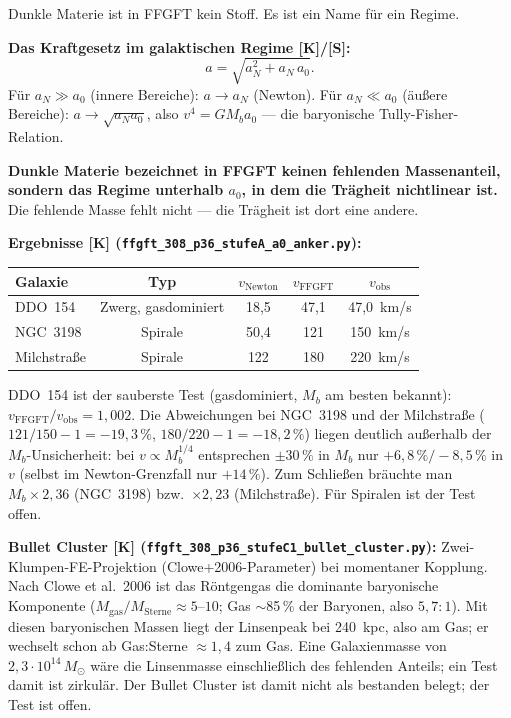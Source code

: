 Dunkle Materie ist in FFGFT kein Stoff.
Es ist ein Name für ein Regime.

\textbf{Das Kraftgesetz im galaktischen Regime [K]/[S]:}
\[
  a = \sqrt{a_N^2 + a_N\,a_0} .
\]
Für $a_N \gg a_0$ (innere Bereiche): $a \to a_N$ (Newton).
Für $a_N \ll a_0$ (äußere Bereiche): $a \to \sqrt{a_N a_0}$,
also $v^4 = G M_b a_0$ — die baryonische Tully-Fisher-Relation.

\textbf{Dunkle Materie bezeichnet in FFGFT keinen fehlenden Massenanteil,
sondern das Regime unterhalb $a_0$, in dem die Trägheit nichtlinear ist.}
Die fehlende Masse fehlt nicht — die Trägheit ist dort eine andere.

\textbf{Ergebnisse [K]
(\texttt{ffgft\_308\_p36\_stufeA\_a0\_anker.py}):}

\begin{center}
\begin{tabular}{lcccc}
\toprule
Galaxie & Typ & $v_\text{Newton}$ & $v_\text{FFGFT}$ & $v_\text{obs}$ \\
\midrule
DDO~154   & Zwerg, gasdominiert & 18{,}5 & 47{,}1 & 47{,}0~km/s \\
NGC~3198  & Spirale             & 50{,}4 & 121   & 150~km/s \\
Milchstraße & Spirale           & 122   & 180   & 220~km/s \\
\bottomrule
\end{tabular}
\end{center}

DDO~154 ist der sauberste Test (gasdominiert, $M_b$ am besten bekannt):
$v_\text{FFGFT}/v_\text{obs} = 1{,}002$. Die Abweichungen bei NGC~3198
und der Milchstraße ($121/150 - 1 = -19{,}3\,\%$, $180/220 - 1 = -18{,}2\,\%$)
liegen deutlich außerhalb der $M_b$-Unsicherheit: bei $v \propto M_b^{1/4}$
entsprechen $\pm30\,\%$ in $M_b$ nur $+6{,}8\,\%/-8{,}5\,\%$ in $v$ (selbst im
Newton-Grenzfall nur $+14\,\%$). Zum Schließen bräuchte man $M_b \times 2{,}36$
(NGC~3198) bzw.\ $\times 2{,}23$ (Milchstraße). Für Spiralen ist der Test offen.

\textbf{Bullet Cluster [K]
(\texttt{ffgft\_308\_p36\_stufeC1\_bullet\_cluster.py}):}
Zwei-Klumpen-FE-Projektion (Clowe+2006-Parameter) bei momentaner Kopplung.
Nach Clowe et al.\ 2006 ist das Röntgengas die dominante baryonische
Komponente ($M_\text{gas}/M_\text{Sterne} \approx 5$--$10$; Gas $\sim$85\,\%
der Baryonen, also $5{,}7:1$). Mit diesen baryonischen Massen liegt der
Linsenpeak bei 240~kpc, also am Gas; er wechselt schon ab
Gas:Sterne $\approx 1{,}4$ zum Gas. Eine Galaxienmasse von
$2{,}3\cdot10^{14}\,M_\odot$ wäre die Linsenmasse einschließlich des fehlenden
Anteils; ein Test damit ist zirkulär. Der Bullet Cluster ist damit
nicht als bestanden belegt; der Test ist offen.

